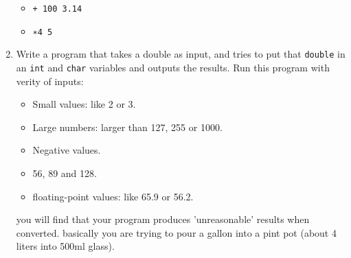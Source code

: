 \documentclass[11pt]{article}
\begin{document}
\begin{enumerate}
\begin{itemize}
\item \texttt{+ 100 3.14}
\item \texttt{∗4 5}
\end{itemize}
\item Write a program that takes a double as input, and tries to put that \texttt{double} in an \texttt{int} and \texttt{char} variables and outputs the results. Run this program with verity of inputs:
\begin{itemize}
\item Small values: like 2 or 3.
\item Large numbers: larger than 127, 255 or 1000.
\item Negative values.
\item 56, 89 and 128.
\item floating-point values: like 65.9 or 56.2.
\end{itemize}
you will find that your program produces 'unreasonable' results when converted. basically you are trying to pour a gallon into a pint pot (about 4 liters into 500ml glass).
\end{enumerate}
\end{document}
